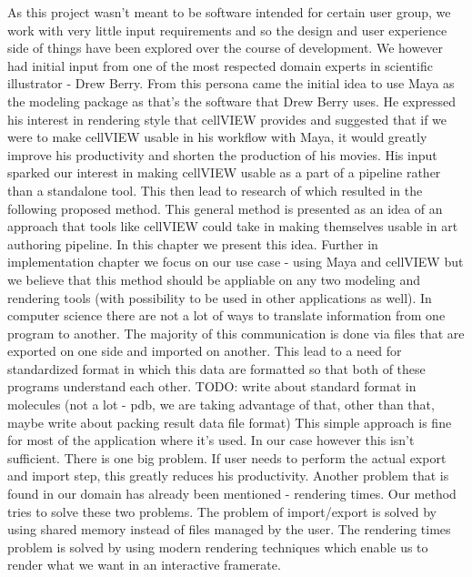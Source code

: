 \documentclass[
  digital, %
  table,   %
  lof,     %
  lot,     %
]{fithesis3}
\begin{document}
As this project wasn't meant to be software intended for certain user group, we work with very little input requirements and so the design and user experience side of things have been explored over the course of development. We however had initial input from one of the most respected domain experts in scientific illustrator - Drew Berry. From this persona came the initial idea to use Maya as the modeling package as that's the software that Drew Berry uses. He expressed his interest in rendering style that cellVIEW provides and suggested that if we were to make cellVIEW usable in his workflow with Maya, it would greatly improve his productivity and shorten the production of his movies. His input sparked our interest in making cellVIEW usable as a part of a pipeline rather than a standalone tool. This then lead to research of which resulted in the following proposed method. This general method is presented as an idea of an approach that tools like cellVIEW could take in making themselves usable in art authoring pipeline. In this chapter we present this idea. Further in implementation chapter we focus on our use case - using Maya and cellVIEW but we believe that this method should be appliable on any two modeling and rendering tools (with possibility to be used in other applications as well).
In computer science there are not a lot of ways to translate information from one program to another. The majority of this communication is done via files that are exported on one side and imported on another. This lead to a need for standardized format in which this data are formatted so that both of these programs understand each other. TODO: write about standard format in molecules (not a lot - pdb, we are taking advantage of that, other than that, maybe write about packing result data file format) This simple approach is fine for most of the application where it's used. In our case however this isn't sufficient. There is one big problem. If user needs to perform the actual export and import step, this greatly reduces his productivity. Another problem that is found in our domain has already been mentioned - rendering times. 
Our method tries to solve these two problems. The problem of import/export is solved by using shared memory instead of files managed by the user. The rendering times problem is solved by using modern rendering techniques which enable us to render what we want in an interactive framerate.
\end{document}
